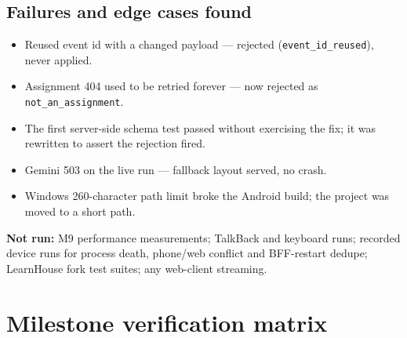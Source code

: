 \documentclass[11pt,a4paper]{article}
\begin{document}
\subsection{Failures and edge cases found}
\begin{itemize}
  \item Reused event id with a changed payload — rejected (\texttt{event\_id\_reused}), never applied.
  \item Assignment 404 used to be retried forever — now rejected as \texttt{not\_an\_assignment}.
  \item The first server-side schema test passed without exercising the fix; it was rewritten to assert the rejection fired.
  \item Gemini 503 on the live run — fallback layout served, no crash.
  \item Windows 260-character path limit broke the Android build; the project was moved to a short path.
\end{itemize}
\textbf{Not run:} M9 performance measurements; TalkBack and keyboard runs; recorded device runs for
process death, phone/web conflict and BFF-restart dedupe; LearnHouse fork test suites; any web-client
streaming.

\newpage
\section{Milestone verification matrix}
\end{document}

